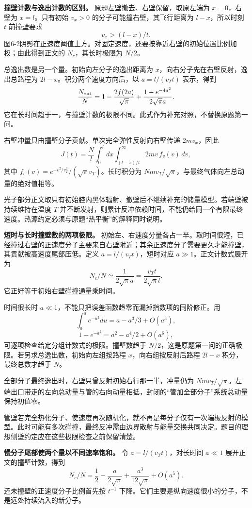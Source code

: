 \documentclass[12pt,a4paper,UTF8]{ctexart}
\begin{document}
\textbf{撞壁计数与逸出计数的区别。} 原题左壁撤去、右壁保留，取原左端为
\(x=0\)，右壁为 \(x=l\)。只有初始 \(v_x>0\)
的分子可能撞右壁，其飞行距离为 \(l-x\)，所以时刻 \(t\) 前撞壁要求 \[
v_x>(l-x)/t.
\]
图6-2阴影在正速度阈值上方。对固定速度，还要按靠近右壁的初始位置比例加权；由此得到正文的
\(N_c\)，其长时极限为 \(N/2\)。

总逸出数是另一个量。初始向左分子的逸出距离为
\(x\)，向右分子先在右壁反射，逸出总路程为
\(2l-x\)。积分两个速度方向后，以 \(a=l/(v_Tt)\) 表示，得到 \[
\frac{N_{\rm out}}N=1-\frac{2f(2a)}{\sqrt\pi}+\frac{1-e^{-4a^2}}{2\sqrt\pi a}.
\]
它在长时间趋于一，与撞壁计数的极限不同。此式作为补充对照，不替换原题第一问。

右壁冲量只由撞壁分子贡献。单次完全弹性反射向右壁传递 \(2mv_x\)，因此 \[
J(t)=\frac Nl\int_0^l dx\int_{(l-x)/t}^{\infty}2mv\,f_v(v)\,dv,
\] 其中 \(f_v(v)=e^{-v^2/v_T^2}/(\sqrt\pi v_T)\)。长时积分为
\(Nm v_T/\sqrt\pi\)，与最终气体向左总动量的绝对值相等。

光子部分正文取只有初始腔内黑体辐射、撤壁后不继续补充的储量模型。若端壁被持续维持在温度
\(T\)
并不断发射，则累计反冲依赖时间，不能仍给同一个有限最终速度。热源约定必须与原题``热平衡''的解释同时说明。

\textbf{短时与长时撞壁数的两项极限。}
初始左、右速度分量各占一半。取时间很短，已经撞过右壁的正速度分子主要来自右壁附近；其余正速度分子需要更久才能撞壁，其贡献被高速度尾部压低。定义
\(a=l/(v_Tt)\)，短时对应 \(a\gg1\)。正文计数式展开为 \[
N_c/N\simeq\frac1{2\sqrt\pi a}
=\frac{v_Tt}{2\sqrt\pi l}.
\] 它正好等于初始右壁碰撞通量乘时间。

时间很长时 \(a\ll1\)，不能只把误差函数趋零而漏掉指数项的同阶修正。用 \[
\int_0^a e^{-u^2}du=a-a^3/3+O(a^5),
\] \[
1-e^{-a^2}=a^2-a^4/2+O(a^6),
\] 可逐项检查给定分组计数式的极限。撞壁数趋于
\(N/2\)，这是原题第一问的正确极限。若另求总逸出数，初始向左组按路程
\(x\)，向右组按反射后路程 \(2l-x\) 积分，最终总数才趋于 \(N\)。

全部分子最终逸出时，右壁只曾反射初始右行那一半，冲量仍为
\(Nm v_T/\sqrt\pi\)。左端出口带走的左向总动量与管的右向动量相抵，封闭的``管加全部分子''系统总动量保持初值零。

管壁若完全热化分子、使速度再次随机化，就不再是每分子仅有一次端板反射的模型。此时可能有多次碰撞，最终反冲需由边界散射与能量交换共同决定。题目的理想侧壁约定应在这些极限检查之前保留清楚。

\textbf{慢分子尾部使两个量以不同速率饱和。} 令 \(a=l/(v_Tt)\)，对长时间
\(a\ll1\) 展开正文的撞壁计数，得到 \[
N_c/N=\frac12-\frac{a}{2\sqrt\pi}+
\frac{a^3}{12\sqrt\pi}+O(a^5).
\] 还未撞壁的正速度分子比例首先按 \(t^{-1}\)
下降。它们主要是纵向速度很小的分子，不是远处持续流入的新分子。
\end{document}

